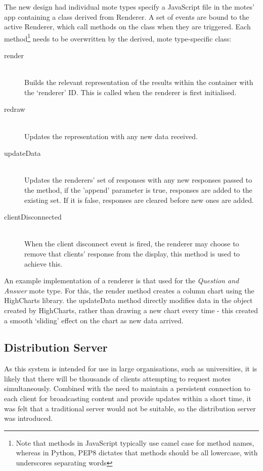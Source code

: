 \documentclass[a4papert,11pt,notitlepage]{ltxdoc}
\begin{document}
The new design had individual mote types specify a JavaScript file in the motes' app containing a class derived from Renderer. A set of events are bound to the active Renderer, which call methods on the class when they are triggered. Each method\footnote{Note that methods in JavaScript typically use camel case for method names, whereas in Python, PEP8 dictates that methods should be all lowercase, with underscores separating words} needs to be overwritten by the derived, mote type-specific class:
\begin{description}
\item[render] \hfill \\
Builds the relevant representation of the results within the container with the `renderer' ID. This is called when the renderer is first initialised.
\item[redraw] \hfill \\
Updates the representation with any new data received.
\item[updateData] \hfill \\
Updates the renderers' set of responses with any new responses passed to the method, if the 'append' parameter is true, responses are added to the existing set. If it is false, responses are cleared before new ones are added.
\item[clientDisconnected] \hfill \\
When the client disconnect event is fired, the renderer may choose to remove that clients' response from the display, this method is used to achieve this.
\end{description}

An example implementation of a renderer is that used for the \emph{Question and Answer} mote type. For this, the render method creates a column chart using the HighCharts\cite{highcharts:web} library. the updateData method directly modifies data in the object created by HighCharts, rather than drawing a new chart every time - this created a smooth `sliding' effect on the chart as new data arrived.

\subsection{Distribution Server}
As this system is intended for use in large organisations, such as universities, it is likely that there will be thousands of clients attempting to request motes simultaneously. Combined with the need to maintain a persistent connection to each client for broadcasting content and provide updates within a short time, it was felt that a traditional server would not be suitable, so the distribution server was introduced.
\end{document}
